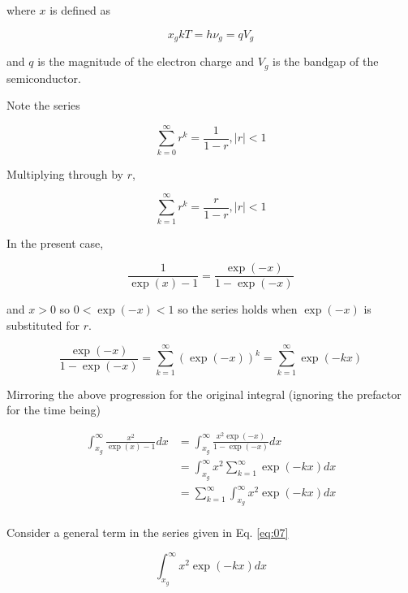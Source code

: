 \documentclass[letterpaper,12pt]{article}
\begin{document}
\noindent where $x$ is defined as

\begin{equation} \label{eq:02}
x_{g}kT = h \nu_{g} = q V_{g}
\end{equation}

\noindent and $q$ is the magnitude of the electron charge and $V_{g}$ is the bandgap of the semiconductor.

Note the series

\begin{equation} \label{eq:03}
\sum_{k = 0}^{\infty} r^{k} = \frac{1}{1-r}, |r| < 1
\end{equation}

\noindent Multiplying through by $r$,

\begin{equation} \label{eq:04}
\sum_{k = 1}^{\infty} r^{k} = \frac{r}{1-r}, |r| < 1
\end{equation}

In the present case,

\begin{equation} \label{eq:05}
\frac{1}{\exp(x) - 1} = \frac{\exp(-x)}{1 - \exp(-x)}
\end{equation}

\noindent and $x > 0$ so $0 < \exp(-x) < 1$ so the series holds when $\exp(-x)$ is substituted for $r$.

\begin{equation} \label{eq:06}
\frac{\exp(-x)}{1 - \exp(-x)} = \sum_{k = 1}^{\infty} \left( \exp(-x) \right)^{k}
= \sum_{k = 1}^{\infty} \exp(-kx)
\end{equation}

Mirroring the above progression for the original integral (ignoring the prefactor for the time being)

\begin{align} \label{eq:07}
\int_{x_{g}}^{\infty} \frac{x^{2}}{\exp(x) - 1} dx &= \int_{x_{g}}^{\infty} \frac{x^{2} \exp(-x)}{1 - \exp(-x)} dx \\
 &= \int_{x_{g}}^{\infty} x^{2} \sum_{k = 1}^{\infty} \exp(-kx) dx \\
 &= \sum_{k = 1}^{\infty} \int_{x_{g}}^{\infty} x^{2} \exp(-kx) dx \\
\end{align}

Consider a general term in the series given in Eq. \ref{eq:07}

\begin{equation} \label{eq:08}
\int_{x_{g}}^{\infty} x^{2} \exp(-kx) dx
\end{equation}
\end{document}
